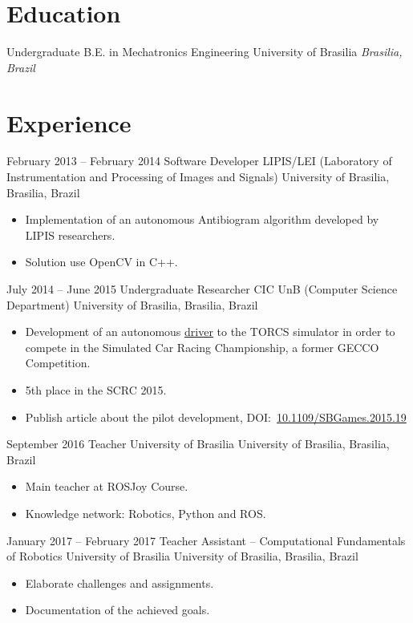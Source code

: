 \documentclass[a4paper, 10pt]{moderncv}        %
\begin{document}
\makecvtitle
\section{Education}
\cventry
{Undergraduate}
{B.E. in Mechatronics Engineering}
{University of Brasilia}
{}
{\textit{Brasilia, Brazil}}
{}
\section{Experience}
\cventry
{February 2013 -- February 2014}
{Software Developer}
{LIPIS/LEI (Laboratory of Instrumentation and Processing of Images and Signals)}
{University of Brasilia, Brasilia, Brazil}
{}
{\begin{itemize}%
    \item Implementation of an autonomous Antibiogram algorithm developed by LIPIS researchers.
    \item Solution use OpenCV in C++.
    \end{itemize}}
\cventry
{July 2014 -- June 2015}
{Undergraduate Researcher}
{CIC UnB (Computer Science Department)}
{University of Brasilia, Brasilia, Brazil}
{}
{\begin{itemize}%
    \item Development of an autonomous \href{https://github.com/bruno147/driver-ga}{driver} to the TORCS simulator in order to compete in the Simulated Car Racing Championship, a former GECCO Competition.
    \item 5th place in the SCRC 2015.
    \item Publish article about the pilot development, DOI:~\href{https://doi.org/10.1109/SBGames.2015.19}{10.1109/SBGames.2015.19}
    \end{itemize}}
\cventry
{September 2016}
{Teacher}
{University of Brasilia}
{University of Brasilia, Brasilia, Brazil}
{}
{\begin{itemize}%
    \item Main teacher at ROSJoy Course.
    \item Knowledge network: Robotics, Python and ROS.
    \end{itemize}}
\cventry
{January 2017 -- February 2017}
{Teacher Assistant -- Computational Fundamentals of Robotics}
{University of Brasilia}
{University of Brasilia, Brasilia, Brazil}
{}
{\begin{itemize}%
    \item Elaborate challenges and assignments.
    \item Documentation of the achieved goals.
    \end{itemize}}
\end{document}

